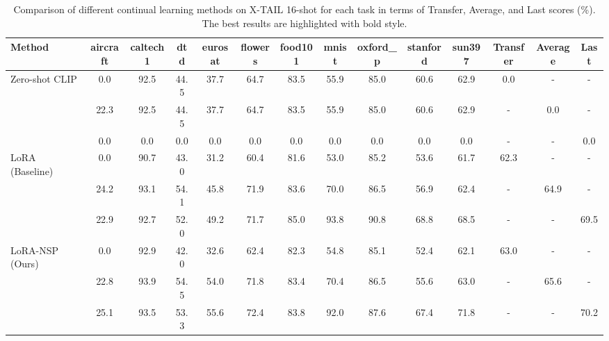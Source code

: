 \begin{table}[t]
\centering
\caption{Comparison of different continual learning methods on X-TAIL 16-shot for each task in terms of Transfer, Average, and Last scores (\%). The best results are highlighted with bold style.}
\label{tab:main_results}
\begin{tabular}{lccccccccccccc}
\toprule
Method & aircraft & caltech1 & dtd & eurosat & flowers & food101 & mnist & oxford_p & stanford & sun397 & Transfer & Average & Last \\
\midrule
Zero-shot CLIP & 0.0 & 92.5 & 44.5 & 37.7 & 64.7 & 83.5 & 55.9 & 85.0 & 60.6 & 62.9 & 0.0 & - & - \\
 & 22.3 & 92.5 & 44.5 & 37.7 & 64.7 & 83.5 & 55.9 & 85.0 & 60.6 & 62.9 & - & 0.0 & - \\
 & 0.0 & 0.0 & 0.0 & 0.0 & 0.0 & 0.0 & 0.0 & 0.0 & 0.0 & 0.0 & - & - & 0.0 \\
LoRA (Baseline) & 0.0 & 90.7 & 43.0 & 31.2 & 60.4 & 81.6 & 53.0 & 85.2 & 53.6 & 61.7 & 62.3 & - & - \\
 & 24.2 & 93.1 & 54.1 & 45.8 & 71.9 & 83.6 & 70.0 & 86.5 & 56.9 & 62.4 & - & 64.9 & - \\
 & 22.9 & 92.7 & 52.0 & 49.2 & 71.7 & 85.0 & 93.8 & 90.8 & 68.8 & 68.5 & - & - & 69.5 \\
LoRA-NSP (Ours) & 0.0 & 92.9 & 42.0 & 32.6 & 62.4 & 82.3 & 54.8 & 85.1 & 52.4 & 62.1 & 63.0 & - & - \\
 & 22.8 & 93.9 & 54.5 & 54.0 & 71.8 & 83.4 & 70.4 & 86.5 & 55.6 & 63.0 & - & 65.6 & - \\
 & 25.1 & 93.5 & 53.3 & 55.6 & 72.4 & 83.8 & 92.0 & 87.6 & 67.4 & 71.8 & - & - & 70.2 \\
\bottomrule
\end{tabular}
\end{table}
